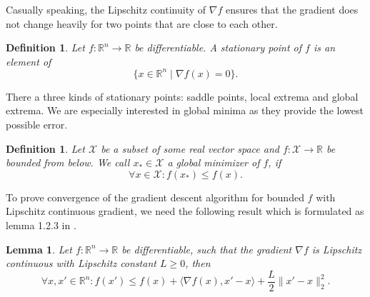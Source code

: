 \documentclass[11pt, a4paper]{article}
\newtheorem{lemma}[theorem]{Lemma}
\newtheorem{definition}[theorem]{Definition}
\newcommand{\R}{\mathbb{R}}
\newcommand{\X}{\mathcal{X}}
\begin{document}
Casually speaking, the Lipschitz continuity of $\nabla f$ ensures that the gradient does not change heavily for two points that are close to each other.

\begin{definition}
Let $f: \R^n \to \R$ be differentiable. A stationary point of $f$ is an element of
\[ \big \{ x \in \R^n \mid \nabla f(x) = 0 \big \}. \]
\end{definition}

There a three kinds of stationary points: saddle points, local extrema and global extrema. We are especially interested in global minima as they provide the lowest possible error.

\begin{definition}
Let $\X$ be a subset of some real vector space and $f: \X \to \R$ be bounded from below. We call $x_* \in \X$ a global minimizer of $f$, if
\[ \forall x \in \X : f(x_*) \leq f(x). \]
\end{definition}

To prove convergence of the gradient descent algorithm for bounded $f$ with Lipschitz continuous gradient, we need the following result which is formulated as lemma 1.2.3 in \cite{ConvexOptimization}.

\begin{lemma} \label{lem:descent}
Let $f: \R^n \to \R$ be differentiable, such that the gradient $\nabla f$ is Lipschitz continuous with Lipschitz constant $L \geq 0$, then
\[ \forall x,x' \in \R^n : f(x') \leq f(x) + \big \langle \nabla f(x) , x' -x \big \rangle + \frac{L}{2} \big \| x'- x \big \|_2^2. \]
\end{lemma}
\end{document}
